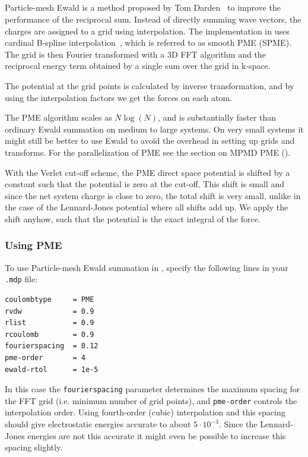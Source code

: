 \subsection{}
\label{sec:pme}
Particle-mesh Ewald is a method proposed by Tom
Darden~\cite{Darden93} to improve the performance of the
reciprocal sum. Instead of directly summing wave vectors, the charges
are assigned to a grid using interpolation. The implementation in
{\gromacs} uses cardinal B-spline interpolation~\cite{Essmann95},
which is referred to as smooth PME (SPME).
The grid is then Fourier transformed with a 3D FFT algorithm and the
reciprocal energy term obtained by a single sum over the grid in
k-space.

The potential at the grid points is calculated by inverse
transformation, and by using the interpolation factors we get the
forces on each atom. 

The PME algorithm scales as $N \log(N)$, and is substantially faster
than ordinary Ewald summation on medium to large systems. On very
small systems it might still be better to use Ewald to avoid the
overhead in setting up grids and transforms.
For the parallelization of PME see the section on MPMD PME ().

With the Verlet cut-off scheme, the PME direct space potential is
shifted by a constant such that the potential is zero at the
cut-off. This shift is small and since the net system charge is close
to zero, the total shift is very small, unlike in the case of the
Lennard-Jones potential where all shifts add up. We apply the shift
anyhow, such that the potential is the exact integral of the force.

\subsubsection{Using PME}
To use Particle-mesh Ewald summation in {\gromacs}, specify the
following lines in your {\tt .mdp} file:

\begin{verbatim}
coulombtype     = PME
rvdw            = 0.9
rlist           = 0.9
rcoulomb        = 0.9
fourierspacing  = 0.12
pme-order       = 4
ewald-rtol      = 1e-5
\end{verbatim}

In this case the {\tt fourierspacing} parameter determines the maximum
spacing for the FFT grid (i.e. minimum number of grid points),
and {\tt pme-order} controls the
interpolation order. Using fourth-order (cubic) interpolation and this
spacing should give electrostatic energies accurate to about
$5\cdot10^{-3}$. Since the Lennard-Jones energies are not this
accurate it might even be possible to increase this spacing slightly.

